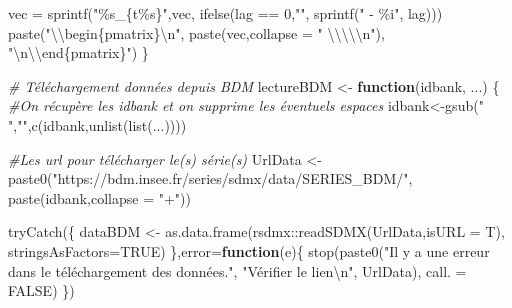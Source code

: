 \documentclass[
  11pt,
]{article}
\newenvironment{Shaded}{\begin{snugshade}}{\end{snugshade}}
\newcommand{\AttributeTok}[1]{\textcolor[rgb]{0.77,0.63,0.00}{#1}}
\newcommand{\CommentTok}[1]{\textcolor[rgb]{0.56,0.35,0.01}{\textit{#1}}}
\newcommand{\ConstantTok}[1]{\textcolor[rgb]{0.00,0.00,0.00}{#1}}
\newcommand{\ControlFlowTok}[1]{\textcolor[rgb]{0.13,0.29,0.53}{\textbf{#1}}}
\newcommand{\DecValTok}[1]{\textcolor[rgb]{0.00,0.00,0.81}{#1}}
\newcommand{\FunctionTok}[1]{\textcolor[rgb]{0.00,0.00,0.00}{#1}}
\newcommand{\NormalTok}[1]{#1}
\newcommand{\OtherTok}[1]{\textcolor[rgb]{0.56,0.35,0.01}{#1}}
\newcommand{\SpecialCharTok}[1]{\textcolor[rgb]{0.00,0.00,0.00}{#1}}
\newcommand{\StringTok}[1]{\textcolor[rgb]{0.31,0.60,0.02}{#1}}
\begin{document}
\begin{Shaded}
\begin{Highlighting}[]
\NormalTok{    vec }\OtherTok{=} \FunctionTok{sprintf}\NormalTok{(}\StringTok{"\%s\_\{t\%s\}"}\NormalTok{,vec,}
                  \FunctionTok{ifelse}\NormalTok{(lag }\SpecialCharTok{==} \DecValTok{0}\NormalTok{,}\StringTok{""}\NormalTok{,}
                         \FunctionTok{sprintf}\NormalTok{(}\StringTok{" {-} \%i"}\NormalTok{, lag)))}
    \FunctionTok{paste}\NormalTok{(}\StringTok{"}\SpecialCharTok{\textbackslash{}\textbackslash{}}\StringTok{begin\{pmatrix\}}\SpecialCharTok{\textbackslash{}n}\StringTok{"}\NormalTok{,}
          \FunctionTok{paste}\NormalTok{(vec,}\AttributeTok{collapse =} \StringTok{" }\SpecialCharTok{\textbackslash{}\textbackslash{}\textbackslash{}\textbackslash{}\textbackslash{}n}\StringTok{"}\NormalTok{),}
          \StringTok{"}\SpecialCharTok{\textbackslash{}n\textbackslash{}\textbackslash{}}\StringTok{end\{pmatrix\}"}\NormalTok{)}
\NormalTok{\}}


\CommentTok{\# Téléchargement données depuis BDM}
\NormalTok{lectureBDM }\OtherTok{\textless{}{-}} \ControlFlowTok{function}\NormalTok{(idbank, ...)}
\NormalTok{\{}
    \CommentTok{\#On récupère les idbank et on supprime les éventuels espaces}
\NormalTok{    idbank}\OtherTok{\textless{}{-}}\FunctionTok{gsub}\NormalTok{(}\StringTok{" "}\NormalTok{,}\StringTok{""}\NormalTok{,}\FunctionTok{c}\NormalTok{(idbank,}\FunctionTok{unlist}\NormalTok{(}\FunctionTok{list}\NormalTok{(...))))}
    
    \CommentTok{\#Les url pour télécharger le(s) série(s)}
\NormalTok{    UrlData }\OtherTok{\textless{}{-}} \FunctionTok{paste0}\NormalTok{(}\StringTok{"https://bdm.insee.fr/series/sdmx/data/SERIES\_BDM/"}\NormalTok{,}
                      \FunctionTok{paste}\NormalTok{(idbank,}\AttributeTok{collapse =} \StringTok{"+"}\NormalTok{))}
    
    \FunctionTok{tryCatch}\NormalTok{(\{}
\NormalTok{        dataBDM }\OtherTok{\textless{}{-}} \FunctionTok{as.data.frame}\NormalTok{(rsdmx}\SpecialCharTok{::}\FunctionTok{readSDMX}\NormalTok{(UrlData,}\AttributeTok{isURL =}\NormalTok{ T),}
                                 \AttributeTok{stringsAsFactors=}\ConstantTok{TRUE}\NormalTok{)}
\NormalTok{    \},}\AttributeTok{error=}\ControlFlowTok{function}\NormalTok{(e)\{}
        \FunctionTok{stop}\NormalTok{(}\FunctionTok{paste0}\NormalTok{(}\StringTok{"Il y a une erreur dans le téléchargement des données."}\NormalTok{,}
                    \StringTok{"Vérifier le lien}\SpecialCharTok{\textbackslash{}n}\StringTok{"}\NormalTok{,}
\NormalTok{                    UrlData),}
             \AttributeTok{call. =} \ConstantTok{FALSE}\NormalTok{)}
\NormalTok{    \})}
    

\end{Highlighting}
\end{Shaded}
\end{document}
